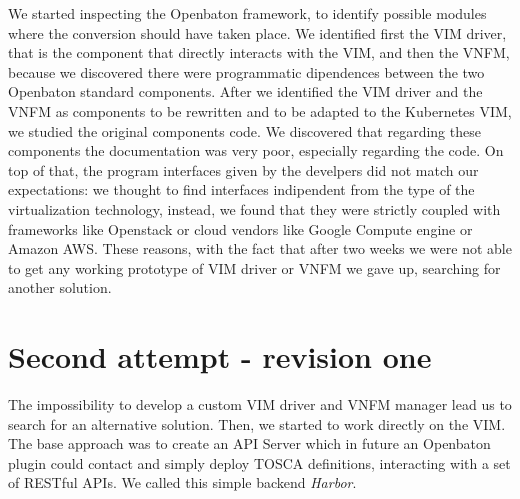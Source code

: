 We started inspecting the Openbaton framework, to identify possible modules
where the conversion should have taken place. We identified first the VIM
driver, that is the component that directly interacts with the VIM, and then the
VNFM, because we discovered there were programmatic dipendences between the two
Openbaton standard components. After we identified the VIM driver and the VNFM
as components to be rewritten and to be adapted to the Kubernetes VIM, we
studied the original components code. We discovered that regarding these
components the documentation was very poor, especially regarding the code. On
top of that, the program interfaces given by the develpers did not match our
expectations: we thought to find interfaces indipendent from the type of the
virtualization technology, instead, we found that they were strictly coupled
with frameworks like Openstack or cloud vendors like Google Compute engine or
Amazon AWS. These reasons, with the fact that after two weeks we were not able
to get any working prototype of VIM driver or VNFM we gave up, searching for
another solution.

\section{Second attempt - revision one}

The impossibility to develop a custom VIM driver and VNFM manager lead us to
search for an alternative solution. Then, we started to work directly on the
VIM. The base approach was to create an API Server which in future an Openbaton
plugin could contact and simply deploy TOSCA definitions, interacting with a set
of RESTful APIs. We called this simple backend \emph{Harbor}.

